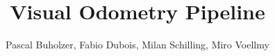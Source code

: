 \documentclass[a4paper,10pt]{article} %
\begin{document}
\title{Visual Odometry Pipeline}
\author{Pascal Buholzer, Fabio Dubois, Milan Schilling, Miro Voellmy}
\maketitle

\newpage

\newpage


\tableofcontents
\newpage

\newpage

\newpage

\newpage



\newpage
%
\end{document}

